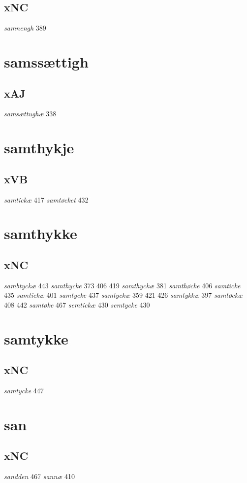 \documentclass[a4paper,twocolumn]{article}
\begin{document}
\subsection{xNC}
\label{sec:org152b79f}
\emph{samnengh} 389 
\section{samssættigh}
\label{sec:org824af70}
\subsection{xAJ}
\label{sec:orgf8c4a97}
\emph{samsættughæ} 338 
\section{samthykje}
\label{sec:orge979c4d}
\subsection{xVB}
\label{sec:org60c57a9}
\emph{samtickæ} 417 \emph{samtøcket} 432 
\section{samthykke}
\label{sec:org331d6c1}
\subsection{xNC}
\label{sec:org35d7141}
\emph{sambtyckæ} 443 \emph{samthycke} 373 406 419 \emph{samthyckæ} 381 \emph{samthøcke} 406 \emph{samticke} 435 \emph{samtickæ} 401 \emph{samtycke} 437 \emph{samtyckæ} 359 421 426 \emph{samtykkæ} 397 \emph{samtøckæ} 408 442 \emph{samtøke} 467 \emph{semtickæ} 430 \emph{semtycke} 430 
\section{samtykke}
\label{sec:orge5e98d2}
\subsection{xNC}
\label{sec:orgd63a00b}
\emph{samtycke} 447 
\section{san}
\label{sec:org624a30f}
\subsection{xNC}
\label{sec:orgd9d16fb}
\emph{sandden} 467 \emph{sannæ} 410 
\end{document}
